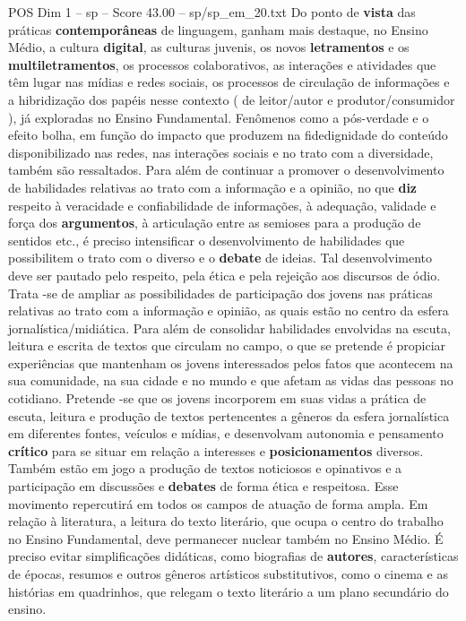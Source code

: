 \begin{textsample}{POS Dim 1 – sp – Score 43.00 – sp/sp\_em\_20.txt}
Do ponto de \textbf{vista} das práticas \textbf{contemporâneas} de linguagem, ganham mais destaque, no Ensino Médio, a cultura \textbf{digital}, as culturas juvenis, os novos \textbf{letramentos} e os \textbf{multiletramentos}, os processos colaborativos, as interações e atividades que têm lugar nas mídias e redes sociais, os processos de circulação de informações e a hibridização dos papéis nesse contexto ( de leitor/autor e produtor/consumidor ), já exploradas no Ensino Fundamental.
Fenômenos como a pós-verdade e o efeito bolha, em função do impacto que produzem na fidedignidade do conteúdo disponibilizado nas redes, nas interações sociais e no trato com a diversidade, também são ressaltados.
Para além de continuar a promover o desenvolvimento de habilidades relativas ao trato com a informação e a opinião, no que \textbf{diz} respeito à veracidade e confiabilidade de informações, à adequação, validade e força dos \textbf{argumentos}, à articulação entre as semioses para a produção de sentidos etc., é preciso intensificar o desenvolvimento de habilidades que possibilitem o trato com o diverso e o \textbf{debate} de ideias.
Tal desenvolvimento deve ser pautado pelo respeito, pela ética e pela rejeição aos discursos de ódio.
Trata -se de ampliar as possibilidades de participação dos jovens nas práticas relativas ao trato com a informação e opinião, as quais estão no centro da esfera jornalística/midiática.
Para além de consolidar habilidades envolvidas na escuta, leitura e escrita de textos que circulam no campo, o que se pretende é propiciar experiências que mantenham os jovens interessados pelos fatos que acontecem na sua comunidade, na sua cidade e no mundo e que afetam as vidas das pessoas no cotidiano.
Pretende -se que os jovens incorporem em suas vidas a prática de escuta, leitura e produção de textos pertencentes a gêneros da esfera jornalística em diferentes fontes, veículos e mídias, e desenvolvam autonomia e pensamento \textbf{crítico} para se situar em relação a interesses e \textbf{posicionamentos} diversos.
Também estão em jogo a produção de textos noticiosos e opinativos e a participação em discussões e \textbf{debates} de forma ética e respeitosa.
Esse movimento repercutirá em todos os campos de atuação de forma ampla.
Em relação à literatura, a leitura do texto literário, que ocupa o centro do trabalho no Ensino Fundamental, deve permanecer nuclear também no Ensino Médio.
É preciso evitar simplificações didáticas, como biografias de \textbf{autores}, características de épocas, resumos e outros gêneros artísticos substitutivos, como o cinema e as histórias em quadrinhos, que relegam o texto literário a um plano secundário do ensino.

\end{textsample}
